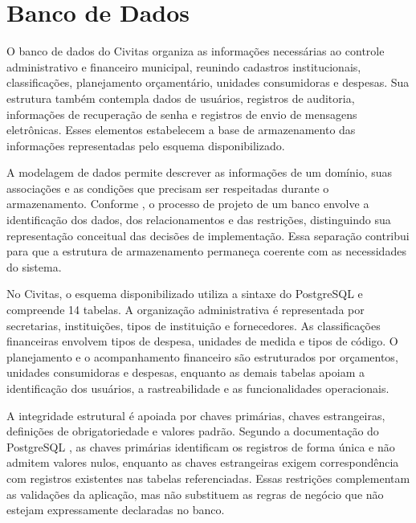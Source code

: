 \fi





\iffalse
\chapter{Banco de Dados}

O banco de dados do Civitas organiza as informações necessárias ao controle administrativo e financeiro municipal, reunindo cadastros institucionais, classificações, planejamento orçamentário, unidades consumidoras e despesas. Sua estrutura também contempla dados de usuários, registros de auditoria, informações de recuperação de senha e registros de envio de mensagens eletrônicas. Esses elementos estabelecem a base de armazenamento das informações representadas pelo esquema disponibilizado.

A modelagem de dados permite descrever as informações de um domínio, suas associações e as condições que precisam ser respeitadas durante o armazenamento. Conforme \textcite{WattEng2014}, o processo de projeto de um banco envolve a identificação dos dados, dos relacionamentos e das restrições, distinguindo sua representação conceitual das decisões de implementação. Essa separação contribui para que a estrutura de armazenamento permaneça coerente com as necessidades do sistema.

No Civitas, o esquema disponibilizado utiliza a sintaxe do PostgreSQL e compreende 14 tabelas. A organização administrativa é representada por secretarias, instituições, tipos de instituição e fornecedores. As classificações financeiras envolvem tipos de despesa, unidades de medida e tipos de código. O planejamento e o acompanhamento financeiro são estruturados por orçamentos, unidades consumidoras e despesas, enquanto as demais tabelas apoiam a identificação dos usuários, a rastreabilidade e as funcionalidades operacionais.

A integridade estrutural é apoiada por chaves primárias, chaves estrangeiras, definições de obrigatoriedade e valores padrão. Segundo a documentação do PostgreSQL \parencite{PostgreSQLConstraints2026}, as chaves primárias identificam os registros de forma única e não admitem valores nulos, enquanto as chaves estrangeiras exigem correspondência com registros existentes nas tabelas referenciadas. Essas restrições complementam as validações da aplicação, mas não substituem as regras de negócio que não estejam expressamente declaradas no banco.


